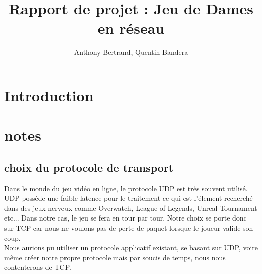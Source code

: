 \documentclass{article}
\title{Rapport de projet : Jeu de Dames en réseau}
\author{Anthony Bertrand, Quentin Bandera}
\date{}
\begin{document}
    \maketitle
    \tableofcontents
    \newpage
    \section{Introduction}

    \section{notes}
        \subsection{choix du protocole de transport}
        Dans le monde du jeu vidéo en ligne, le protocole UDP est très souvent utilisé. UDP possède une faible latence pour le traitement
        ce qui est l'élement recherché dans des jeux nerveux comme Overwatch, League of Legends, Unreal Tournament etc... Dans notre
        cas, le jeu se fera en tour par tour. Notre choix se porte donc sur TCP car nous ne voulons pas de perte de paquet lorsque le joueur
        valide son coup.\\
        Nous aurions pu utiliser un protocole applicatif existant, se basant sur UDP, voire même créer notre propre protocole mais par soucis
        de temps, nous nous contenterons de TCP.
\end{document}

